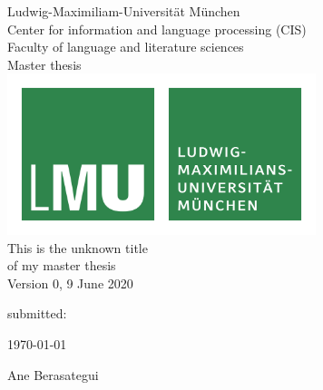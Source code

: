 %
%

\begin{titlepage}
	\begin{center}
		\normalsize
		Ludwig-Maximiliam-Universität München \\
		Center for information and language processing (CIS)  \\
		Faculty of language and literature sciences \\
		\vspace{1cm} %
		\huge
		Master thesis \\
		\vspace{1.5cm}
		\includegraphics[width=9cm]{figures/lmu_logo.png} \\ %
		\vspace{1cm}
		\Large
		This is the unknown title \\
		of my master thesis \\
		\vspace{1cm}
		\tiny Version 0, 9 June 2020
	\end{center}
	\normalsize
	\vfill %
	\begin{labeling}{submitted: }
		\item[submitted:] \today
		\item
		\item[by:] Ane Berasategui
	\end{labeling}
\end{titlepage}

